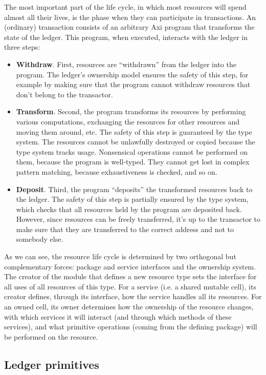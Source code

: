 The most important part of the life cycle, in which most resources will spend almost all their lives, is the phase when they can participate in transactions. An (ordinary) transaction consists of an arbitrary Axi program that transforms the state of the ledger. This program, when executed, interacts with the ledger in three steps:

\begin{itemize}
  \item \textbf{Withdraw}. First, resources are ``withdrawn'' from the ledger into the program. The ledger's ownership model ensures the safety of this step, for example by making sure that the program cannot withdraw resources that don't belong to the transactor.
  \item \textbf{Transform}. Second, the program transforms its resources by performing various computations, exchanging the resources for other resources and moving them around, etc. The safety of this step is guaranteed by the type system. The resources cannot be unlawfully destroyed or copied because the type system tracks usage. Nonsensical operations cannot be performed on them, because the program is well-typed. They cannot get lost in complex pattern matching, because exhaustiveness is checked, and so on.
  \item \textbf{Deposit}. Third, the program ``deposits'' the transformed resources back to the ledger. The safety of this step is partially ensured by the type system, which checks that all resources held by the program are deposited back. However, since resources can be freely transferred, it's up to the transactor to make sure that they are transferred to the correct address and not to somebody else.
\end{itemize}

As we can see, the resource life cycle is determined by two orthogonal but complementary forces: package and service interfaces and the ownership system. The creator of the module that defines a new resource type sets the interface for all uses of all resources of this type. For a service (i.e. a shared mutable cell), its creator defines, through its interface, how the service handles all its resources. For an owned cell, its owner determines how the ownership of the resource changes, with which services it will interact (and through which methods of these services), and what primitive operations (coming from the defining package) will be performed on the resource.

\subsection{Ledger primitives}

